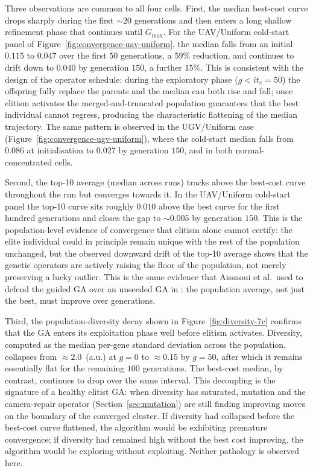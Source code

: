 Three observations are common to all four cells. First, the median best-cost curve drops sharply during the first $\sim 20$ generations and then enters a long shallow refinement phase that continues until $G_{\max}$. For the UAV/Uniform cold-start panel of Figure~\ref{fig:convergence-uav-uniform}, the median falls from an initial $0.115$ to $0.047$ over the first $50$ generations, a $59\%$ reduction, and continues to drift down to $0.040$ by generation $150$, a further $15\%$. This is consistent with the design of the operator schedule: during the exploratory phase ($g<i t_e = 50$) the offspring fully replace the parents and the median can both rise and fall; once elitism activates the merged-and-truncated population guarantees that the best individual cannot regress, producing the characteristic flattening of the median trajectory. The same pattern is observed in the UGV/Uniform case (Figure~\ref{fig:convergence-ugv-uniform}), where the cold-start median falls from $0.086$ at initialisation to $0.027$ by generation $150$, and in both normal-concentrated cells.

Second, the top-10 average (median across runs) tracks above the best-cost curve throughout the run but converges towards it. In the UAV/Uniform cold-start panel the top-10 curve sits roughly $0.010$ above the best curve for the first hundred generations and closes the gap to $\sim 0.005$ by generation $150$. This is the population-level evidence of convergence that elitism alone cannot certify: the elite individual could in principle remain unique with the rest of the population unchanged, but the observed downward drift of the top-10 average shows that the genetic operators are actively raising the floor of the population, not merely preserving a lucky outlier. This is the same evidence that Aissaoui et al.\ used to defend the guided GA over an unseeded GA in \parencite{aissaoui_designing_2018}: the population average, not just the best, must improve over generations.

Third, the population-diversity decay shown in Figure~\ref{fig:diversity-7c} confirms that the GA enters its exploitation phase well before elitism activates. Diversity, computed as the median per-gene standard deviation across the population, collapses from $\approx 2.0$~(a.u.) at $g=0$ to $\approx 0.15$ by $g=50$, after which it remains essentially flat for the remaining $100$ generations. The best-cost median, by contrast, continues to drop over the same interval. This decoupling is the signature of a healthy elitist GA: when diversity has saturated, mutation and the camera-repair operator (Section~\ref{sec:mutation}) are still finding improving moves on the boundary of the converged cluster. If diversity had collapsed before the best-cost curve flattened, the algorithm would be exhibiting premature convergence; if diversity had remained high without the best cost improving, the algorithm would be exploring without exploiting. Neither pathology is observed here.

